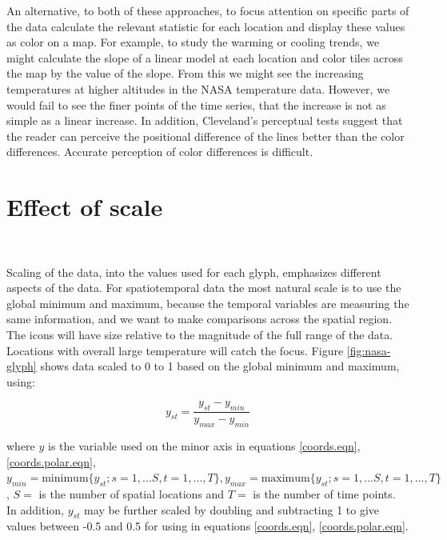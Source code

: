 \documentclass[oneside]{article}
\begin{document}
An alternative, to both of these approaches, to focus attention on specific parts of the data calculate the relevant statistic for each location and display these values as color on a map. For example, to study the warming or cooling trends, we might calculate the slope of a linear model at each location and color tiles across the map by the value of the slope. From this we might see the increasing temperatures at higher altitudes in the NASA temperature data. However, we would fail to see the finer points of the time series, that the increase is not as simple as a linear increase. In addition, Cleveland's \citep{cleveland:1993a} perceptual tests suggest that the reader can perceive the positional difference of the lines better than the color differences. Accurate perception of color differences is difficult.


\section{Effect of scale}~\label{sec:scale}


Scaling of the data, into the values used for each glyph, emphasizes different aspects of the data. For spatiotemporal data the most natural scale is to use the global minimum and maximum, because the temporal variables are measuring the same information, and we want to make comparisons across the spatial region. The icons will have size relative to the magnitude of the full range of the data. Locations with overall large temperature will catch the focus. Figure \ref{fig:nasa-glyph} shows data scaled to 0 to 1 based on the global minimum and maximum, using:

\begin{equation}
y_{st} = \frac{y_{st}-y_{min}}{y_{max}-y_{min}} %
\label{scale1}
\end{equation}

\noindent where $y$ is the variable used on the minor axis in equations \ref{coords.eqn}, \ref{coords.polar.eqn}, $y_{min} = \mbox{minimum}\{y_{st}; s=1, \dots S, t=1, ..., T \}, y_{max} = \mbox{maximum}\{y_{st}; s=1, \dots S, t=1, ..., T\}$, $S=$ is the number of spatial locations and $T=$ is the number of time points. In addition, $y_{st}$ may be further scaled by doubling and subtracting 1 to give values between -0.5 and 0.5 for using in equations \ref{coords.eqn}, \ref{coords.polar.eqn}.
\end{document}
